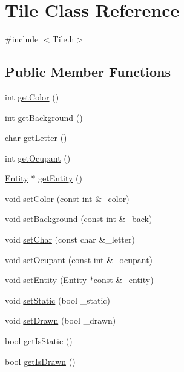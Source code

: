 \hypertarget{class_tile}{}\section{Tile Class Reference}
\label{class_tile}


{\ttfamily \#include $<$Tile.\+h$>$}

\subsection*{Public Member Functions}
\begin{DoxyCompactItemize}
\item 
int \hyperlink{class_tile_a1f78cc2af18988a498efb5a835ba3099}{get\+Color} ()
\item 
int \hyperlink{class_tile_a19a39bb8af4bac1330b13248397f5676}{get\+Background} ()
\item 
char \hyperlink{class_tile_afc218c65412cc6c2065d12655a50bb91}{get\+Letter} ()
\item 
int \hyperlink{class_tile_a099498fe5e6da58cb180402ab0a80e33}{get\+Ocupant} ()
\item 
\hyperlink{class_entity}{Entity} $\ast$ \hyperlink{class_tile_a2cedc53ffae2370ae1c7f7df2c8c9933}{get\+Entity} ()
\item 
void \hyperlink{class_tile_a86242124a0890595d0f523060de4ea76}{set\+Color} (const int \&\+\_\+color)
\item 
void \hyperlink{class_tile_a423abf0e144241f75ea6d66b958b7a01}{set\+Background} (const int \&\+\_\+back)
\item 
void \hyperlink{class_tile_afc534065ecec958c479461e352785827}{set\+Char} (const char \&\+\_\+letter)
\item 
void \hyperlink{class_tile_aa431348bc166683bbb6e66ec0fb3763b}{set\+Ocupant} (const int \&\+\_\+ocupant)
\item 
void \hyperlink{class_tile_af84f312f41aac834deafeac923d61d44}{set\+Entity} (\hyperlink{class_entity}{Entity} $\ast$const \&\+\_\+entity)
\item 
void \hyperlink{class_tile_a6d696247c6c9c8d9db76ed446366edbe}{set\+Static} (bool \+\_\+static)
\item 
void \hyperlink{class_tile_a04fb6595abd60793fafa1154849de12e}{set\+Drawn} (bool \+\_\+drawn)
\item 
bool \hyperlink{class_tile_a0f907344cbf2e058545597949effad02}{get\+Is\+Static} ()
\item 
bool \hyperlink{class_tile_a6f49ff69c5a2f97b8432b2febb0eec9a}{get\+Is\+Drawn} ()
\end{DoxyCompactItemize}
